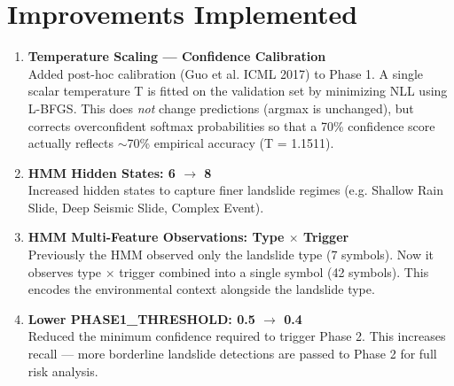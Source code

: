 \documentclass[11pt]{article}
\begin{document}
\section{Improvements Implemented}

\begin{enumerate}
    \item \textbf{Temperature Scaling — Confidence Calibration} \\
          Added post-hoc calibration (Guo et al. ICML 2017) to Phase 1. A single scalar temperature T is fitted on the validation set by minimizing NLL using L-BFGS. This does \textit{not} change predictions (argmax is unchanged), but corrects overconfident softmax probabilities so that a 70\% confidence score actually reflects $\sim$70\% empirical accuracy (T = 1.1511).
    \item \textbf{HMM Hidden States: 6 $\rightarrow$ 8} \\
          Increased hidden states to capture finer landslide regimes (e.g. Shallow Rain Slide, Deep Seismic Slide, Complex Event).
    \item \textbf{HMM Multi-Feature Observations: Type $\times$ Trigger} \\
          Previously the HMM observed only the landslide type (7 symbols). Now it observes type $\times$ trigger combined into a single symbol (42 symbols). This encodes the environmental context alongside the landslide type.
    \item \textbf{Lower PHASE1\_THRESHOLD: 0.5 $\rightarrow$ 0.4} \\
          Reduced the minimum confidence required to trigger Phase 2. This increases recall — more borderline landslide detections are passed to Phase 2 for full risk analysis.
\end{enumerate}
\end{document}
